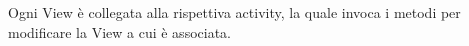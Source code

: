 Ogni View è collegata alla rispettiva activity, la quale invoca i metodi per modificare la View a cui è associata.

